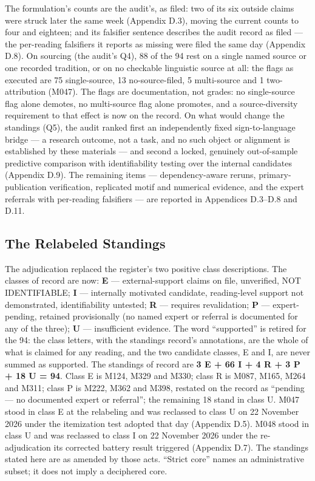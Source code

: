 \documentclass[11pt]{article}
\begin{document}
The formulation's counts are the audit's, as filed: two of its
six outside claims were struck later the same week (Appendix
D.3), moving the current counts to four and eighteen; and its
falsifier sentence describes the audit record as filed --- the
per-reading falsifiers it reports as missing were filed the same
day (Appendix D.8). On sourcing (the audit's Q4), 88 of the 94
rest on a single named source or one recorded tradition, or on
no checkable linguistic source at all: the flags as executed are
75 single-source, 13 no-source-filed, 5 multi-source and 1
two-attribution (M047). The flags are documentation, not grades:
no single-source flag alone demotes, no multi-source flag alone
promotes, and a source-diversity requirement to that effect is
now on the record. On what would change the standings (Q5), the
audit ranked first an independently fixed sign-to-language
bridge --- a research outcome, not a task, and no such object or
alignment is established by these materials --- and second a
locked, genuinely out-of-sample predictive comparison with
identifiability testing over the internal candidates (Appendix
D.9). The remaining items --- dependency-aware reruns,
primary-publication verification, replicated motif and numerical
evidence, and the expert referrals with per-reading falsifiers
--- are reported in Appendices D.3--D.8 and D.11.

\subsection{The Relabeled Standings}\label{appendix-d2-relabel}

The adjudication replaced the register's two positive class
descriptions. The classes of record are now: \textbf{E} ---
external-support claims on file, unverified, NOT IDENTIFIABLE;
\textbf{I} --- internally motivated candidate, reading-level
support not demonstrated, identifiability untested; \textbf{R}
--- requires revalidation; \textbf{P} --- expert-pending,
retained provisionally (no named expert or referral is
documented for any of the three); \textbf{U} --- insufficient
evidence. The word ``supported'' is retired for the 94: the
class letters, with the standings record's annotations, are the
whole of what is claimed for any reading, and the two candidate
classes, E and I, are never summed as supported. The standings
of record are \textbf{3 E + 66 I + 4 R + 3 P + 18 U = 94}. Class
E is M124, M329 and M330; class R is M087, M165, M264 and
M311; class P is M222, M362 and M398, restated on the record as
``pending --- no documented expert or referral''; the remaining
18 stand in class U. M047 stood in class E at the relabeling and
was reclassed to class U on 22 November 2026 under the
itemization test adopted that day (Appendix D.5). M048 stood in
class U and was reclassed to class I on 22 November 2026 under
the re-adjudication its corrected battery result triggered
(Appendix D.7). The standings stated here are as amended by
those acts. ``Strict core'' names an administrative
subset; it does not imply a deciphered core.
\end{document}
